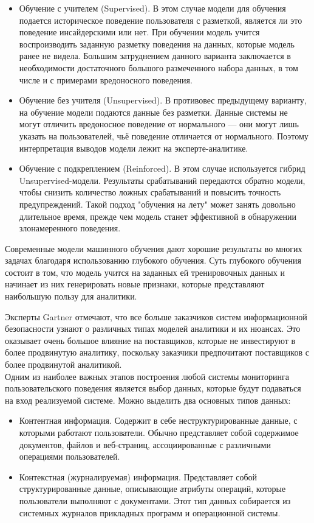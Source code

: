 \begin{itemize}
	\item Обучение с учителем (Supervised). В этом случае модели для обучения подается историческое поведение пользователя с разметкой, является ли это поведение инсайдерскими или нет. При обучении модель учится воспроизводить заданную разметку поведения на данных, которые модель ранее не видела. Большим затруднением данного варианта заключается в необходимости достаточного большого размеченного набора данных, в том числе и с примерами вредоносного поведения.\\
	\item Обучение без учителя (Unsupervised). В противовес предыдущему варианту, на обучение модели подаются данные без разметки. Данные системы не могут отличить вредоносное поведение от нормального --- они могут лишь указать на пользователей, чьё поведение отличается от нормального. Поэтому интерпретация выводов модели лежит на эксперте-аналитике.\\
	\item Обучение с подкреплением (Reinforced). В этом случае используется гибрид Unsupervised-модели. Результаты срабатываний передаются обратно модели, чтобы снизить количество ложных срабатываний и повысить точность предупреждений. Такой подход "обучения на лету" может занять довольно длительное время, прежде чем модель станет эффективной в обнаружении злонамеренного поведения.\\
\end{itemize}

Современные модели машинного обучения дают хорошие результаты во многих задачах благодаря использованию глубокого обучения. Суть глубокого обучения состоит в том, что модель учится на заданных ей тренировочных данных и начинает из них генерировать новые признаки, которые представляют наибольшую пользу для аналитики.

Эксперты Gartner \cite{GartnerReportMarket2019} отмечают, что все больше заказчиков систем информационной безопасности узнают о различных типах моделей аналитики и их нюансах. Это оказывает очень большое влияние на поставщиков, которые не инвестируют в более продвинутую аналитику, поскольку заказчики предпочитают поставщиков с более продвинутой аналитикой.\\

Одним из наиболее важных этапов построения любой системы мониторинга пользовательского поведения является выбор данных, которые будут подаваться на вход реализуемой системе. Можно выделить два основных типов данных: 
\begin{itemize}
	\item Контентная информация. Содержит в себе неструктурированные данные, с которыми работают пользователи. Обычно представляет собой содержимое документов, файлов и веб-страниц, ассоциированные с различными операциями пользователей.
	\item Контекстная (журналируемая) информация. Представляет собой структурированные данные, описывающие атрибуты операций, которые пользователи выполняют с документами. Этот тип данных собирается из системных журналов прикладных программ и операционной системы.\\
\end{itemize}


